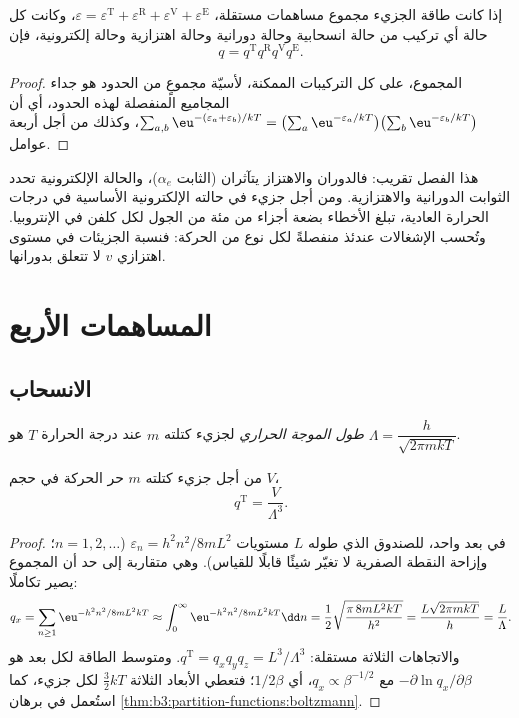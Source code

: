 \begin{proposition}\label{prop:b3:partition-functions:factorisation}
إذا كانت طاقة الجزيء مجموع مساهمات مستقلة،
$\varepsilon = \varepsilon^{\mathrm T} + \varepsilon^{\mathrm R} + \varepsilon^{\mathrm V} + \varepsilon^{\mathrm E}$، وكانت كل حالة
أي تركيب من حالة انسحابية وحالة دورانية وحالة اهتزازية 
وحالة إلكترونية، فإن
\[
  q = q^{\mathrm T}q^{\mathrm R}q^{\mathrm V}q^{\mathrm E}.
\]
\end{proposition}

\begin{proof}
المجموع، على كل التركيبات الممكنة، لأسيّة مجموعٍ من الحدود هو جداء
المجاميع المنفصلة لهذه الحدود، أي أن $\sum_{a,b}\eu^{-(\varepsilon_a+\varepsilon_b)/kT} = \bigl(\sum_a\eu^{-\varepsilon_a/kT}\bigr)
\bigl(\sum_b\eu^{-\varepsilon_b/kT}\bigr)$، وكذلك من أجل أربعة عوامل.
\end{proof}

هذا الفصل تقريب: فالدوران والاهتزاز يتآثران (الثابت
$\alpha_e$)، والحالة الإلكترونية تحدد الثوابت الدورانية والاهتزازية.
ومن أجل جزيء في حالته الإلكترونية الأساسية في درجات الحرارة
العادية، تبلغ الأخطاء بضعة أجزاء من مئة من الجول لكل كلفن في
الإنتروبيا. وتُحسب الإشغالات عندئذ منفصلةً لكل نوع من الحركة:
فنسبة الجزيئات في مستوى اهتزازي $v$ لا تتعلق
بدورانها.

\section{المساهمات الأربع}

\subsection*{الانسحاب}

\begin{definition}\label{def:b3:partition-functions:thermal-wavelength}
\emph{طول الموجة الحراري} لجزيء كتلته $m$ عند
درجة الحرارة $T$ هو $\Lambda = \dfrac{h}{\sqrt{2\pi mkT}}$.
\end{definition}

\begin{proposition}\label{prop:b3:partition-functions:q-trans}
من أجل جزيء كتلته $m$ حر الحركة في حجم $V$،
\[
  q^{\mathrm T} = \frac{V}{\Lambda^3}.
\]
\end{proposition}

\begin{proof}
في بعد واحد، للصندوق الذي طوله $L$ مستويات $\varepsilon_n = h^2n^2/8mL^2$
($n = 1, 2, \dots$؛ وإزاحة النقطة الصفرية لا تغيّر شيئًا قابلًا للقياس). وهي
متقاربة إلى حد أن المجموع يصير تكاملًا:
\[
  q_x = \sum_{n\ge1}\eu^{-h^2n^2/8mL^2kT} \approx \int_0^\infty\eu^{-h^2n^2/8mL^2kT}\dd n
      = \frac12\sqrt{\frac{\pi\,8mL^2kT}{h^2}} = \frac{L\sqrt{2\pi mkT}}{h} = \frac{L}{\Lambda}.
\]
والاتجاهات الثلاثة مستقلة: $q^{\mathrm T} = q_xq_yq_z = L^3/\Lambda^3$. 
ومتوسط الطاقة لكل بعد هو $-\partial\ln q_x/\partial\beta$ مع $q_x \propto \beta^{-1/2}$، أي
$1/2\beta$؛ فتعطي الأبعاد الثلاثة $\frac32kT$ لكل جزيء، كما استُعمل في برهان
\cref{thm:b3:partition-functions:boltzmann}.
\end{proof}

